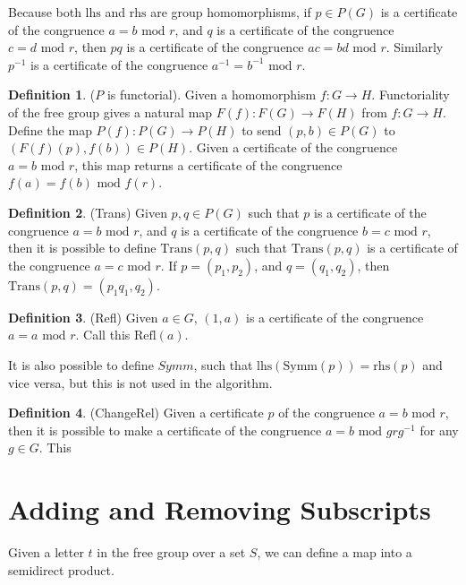 \documentclass[11pt]{article} %
\theoremstyle{definition}
\theoremstyle{definition}
\theoremstyle{definition}
\theoremstyle{definition}
\theoremstyle{definition}
\theoremstyle{definition}
\newtheorem{subdef}{Definition}[theorem]
\begin{document}
Because both $\text{lhs}$ and $\text{rhs}$ are group homomorphisms, if $p \in P(G)$ is a certificate
of the congruence $a = b \text{ mod } r$, and $q$ is a certificate of the congruence
$c = d \text{ mod } r$, then $pq$ is a certificate of the congruence $ac = bd \text{ mod } r$.
Similarly $p^{-1}$ is a certificate of the congruence $a^{-1} = b^{-1} \text{ mod } r$.

\begin{subdef}($P$ is functorial).
  Given a homomorphism $f : G \to H$.
  Functoriality of the free group gives a natural map $F(f) : F(G) \to F(H)$ from $f : G \to H$.
  Define the map $P(f) : P(G) \to P(H)$ to send $(p, b) \in P(G)$ to $(F(f)(p), f(b)) \in P(H)$.
  Given a certificate of the congruence $a = b \text{ mod } r$, this map returns
  a certificate of the congruence $f(a) = f(b) \text{ mod } f(r)$.
\end{subdef}


\begin{subdef}(Trans)
  Given $p,q \in P(G)$ such that $p$ is a certificate of the congruence $a = b \text{ mod } r$,
  and $q$ is a certificate of the congruence $b = c \text{ mod } r$, then it is possible to define
  $\text{Trans}(p,q)$ such that $\text{Trans}(p,q)$ is a certificate of the congruence $a = c \text{ mod } r$.
  If $p = (p_1, p_2)$, and $q = (q_1, q_2)$, then $\text{Trans}(p,q) = (p_1q_1, q_2)$.
\end{subdef}

\begin{subdef}(Refl)
  Given $a \in G$, $(1, a)$ is a certificate of the congruence $a = a \text{ mod } r$. Call
  this $\text{Refl}(a)$.
\end{subdef}

It is also possible to define $\textit{Symm}$, such that $\text{lhs}(\text{Symm}(p)) = \text{rhs}(p)$
and vice versa, but this is not used in the algorithm.

\begin{subdef}(ChangeRel)
  Given a certificate $p$ of the congruence $a = b \text{ mod } r$, then it is possible
  to make a certificate of the congruence $a = b \text{ mod } g r g^{-1}$ for any $g \in G$.
  This
\end{subdef}

\section{Adding and Removing Subscripts}

Given a letter $t$ in the free group over a set $S$, we can define a map into a
semidirect product.
\end{document}
